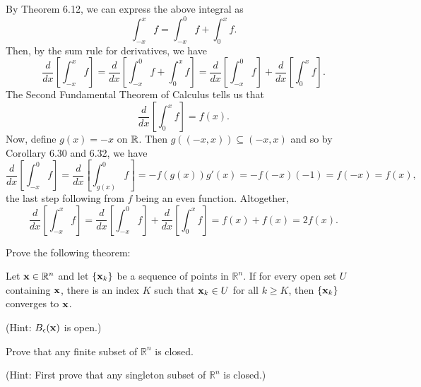 \documentclass[letterpaper, twoside, 12pt]{book}
\begin{document}
\begin{solution}
    By Theorem 6.12, we can express the above integral as
    \[ \int_{-x}^{x} f = \int_{-x}^{0} f + \int_{0}^{x} f .\]
    Then, by the sum rule for derivatives, we have
    \[ \frac{d}{dx} \left[\int_{-x}^{x} f \right] = 
    \frac{d}{dx} \left[\int_{-x}^{0} f  + \int_{0}^{x} f \right] =
    \frac{d}{dx} \left[ \int_{-x}^{0} f \right] + 
    \frac{d}{dx} \left[ \int_{0}^{x} f \right] .\]
    The Second Fundamental Theorem of Calculus tells us that 
    \[ \frac{d}{dx} \left[ \int_{0}^{x} f \right] = f(x) .\]
    Now, define \(g(x) = -x\) on \(\mathbb R\). Then 
    \(g((-x, x)) \subseteq (-x, x)\) and so by Corollary 6.30
    and 6.32, we have
    \[ \frac{d}{dx} \left[ \int_{-x}^{0} f \right] = 
       \frac{d}{dx} \left[ \int_{g(x)}^{0} f \right] =
       - f(g(x)) g'(x) = - f(-x) (-1) = f(-x) = f(x) ,\]
    the last step following from \(f\) being an even function. 
    Altogether,
    \[ \frac{d}{dx} \left[\int_{-x}^{x} f \right] = 
       \frac{d}{dx} \left[ \int_{-x}^{0} f \right] + 
       \frac{d}{dx} \left[ \int_{0}^{x} f \right]  = 
       f(x) + f(x) = 2f(x) .\]
\end{solution}

\begin{exercise}[4]
Prove the following theorem:

Let \(\mathbf x\in\mathbb R^n\) and let \(\{\mathbf x_k\}\) be a sequence
of points in \(\mathbb R^n\). If for every open set \(U\)
containing \(\mathbf x\), there is an index \(K\) such that
\(\mathbf x_k\in U\) for all \(k\geq K\),
then \(\{\mathbf x_k\}\) converges to \(\mathbf x\).

(Hint: \(B_\epsilon(\mathbf x)\) is open.)
\end{exercise}
\begin{solution}

\end{solution}

\begin{exercise}[5]
Prove that any finite subset of \(\mathbb R^n\) is closed.

(Hint: First
prove that any singleton subset of \(\mathbb R^n\) is closed.)
\end{exercise}
\begin{solution}

\end{solution}
\end{document}

